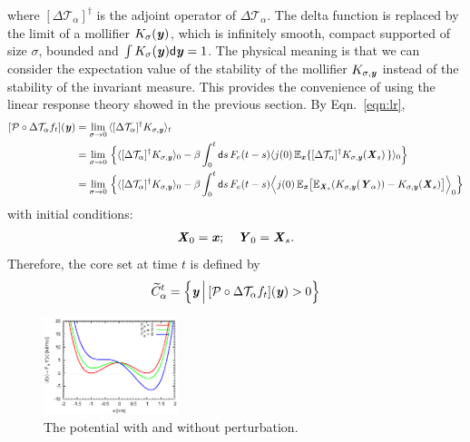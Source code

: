 \documentclass[aip,jcp,a4paper,reprint,onecolumn]{revtex4-1}
\newcommand{\vect}[1]{\textbf{\textit{#1}}}
\newcommand{\dd}{\textsf{d}}
\newcommand{\mt}{\mathcal T}
\begin{document}
where $[\Delta \mt_\alpha]^\dagger$ is the adjoint operator of $\Delta
\mt_\alpha$. The delta
function is replaced by the limit of a mollifier $K_\sigma(\vect y)$,
which is infinitely smooth, compact supported of size $\sigma$,
bounded and $\int
K_\sigma(\vect y)\dd \vect y = 1$.  The physical meaning is that we
can consider the expectation value of the stability of the mollifier
$K_{\sigma, \vect y}$ instead of the stability of the invariant measure.
This provides the convenience of using the linear response theory showed
in the previous section. By Eqn.~\eqref{eqn:lr},
\begin{align}\nonumber
  [\mathcal P\circ\Delta \mt_\alpha f_t](\vect y)
  &=
  \lim_{\sigma \rightarrow 0}\,
  \langle
  [\Delta \mt_\alpha]^\dagger K_{\sigma, \vect y}
  \rangle_t \\\nonumber
  &=
  \lim_{\sigma \rightarrow 0}\,
  \Big\{
  \langle
  [\Delta \mt_\alpha]^\dagger K_{\sigma, \vect y}
  \rangle_0  -
  \beta
  \int_0^t\dd s\,
  F_e(t-s)
  \langle
  j(0)\,
  \mathbb E_{\vect x}\{
  [\Delta \mt_\alpha]^\dagger K_{\sigma, \vect y}(\vect X_s)\,
  \}
  \rangle_0
  \Big\} \\ \label{eqn:main}
  &=
  \lim_{\sigma \rightarrow 0}\,
  \Big\{
  \langle
  [\Delta \mt_\alpha]^\dagger K_{\sigma, \vect y}
  \rangle_0  -
  \beta
  \int_0^t\dd s\,
  F_e(t-s)
  \Big\langle
  j(0)\,
  \mathbb E_{\vect x}
  \big[
  \mathbb E_{\vect X_s}
  (K_{\sigma, \vect y}(\vect Y_\alpha))
  -
  K_{\sigma, \vect y}(\vect X_s)
  \big]
  \Big\rangle_0
  \Big\}
\end{align}
with initial conditions:
\begin{align}
  \vect X_0 = \vect x; \quad \vect Y_0 = \vect X_s.
\end{align}
Therefore, the core set at time $t$ is defined by
\begin{align}
  \widetilde C_\alpha^t =
  \Big\{
  \vect y
  \,\Big\vert\,
  [\mathcal P\circ\Delta \mt_\alpha f_t](\vect y) > 0
  \Big\}
\end{align}


\begin{figure}
  \centering
  \includegraphics[width=0.35\textwidth]{figs/fig-pot.eps}
  \caption{The potential with and without perturbation.}
  \label{fig:tmp1}
\end{figure}
\end{document}
